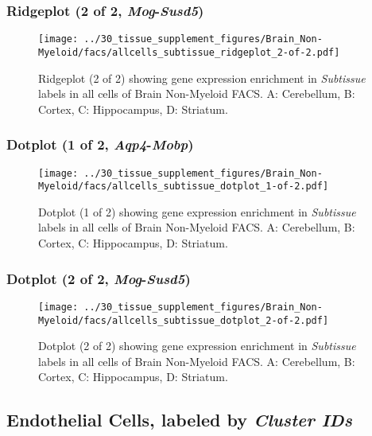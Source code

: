 \clearpage

\subsubsection{Ridgeplot (2 of 2, \emph{Mog}-\emph{Susd5})}
\begin{figure}[h]
\centering
\texttt{[image: ../30\_tissue\_supplement\_figures/Brain\_Non-Myeloid/facs/allcells\_subtissue\_ridgeplot\_2-of-2.pdf]}

\caption{ Ridgeplot (2 of 2)  showing gene expression enrichment in \emph{Subtissue} labels in all cells of Brain Non-Myeloid FACS. A: Cerebellum, B: Cortex, C: Hippocampus, D: Striatum.}
\end{figure}


\clearpage

\subsubsection{Dotplot (1 of 2, \emph{Aqp4}-\emph{Mobp})}
\begin{figure}[h]
\centering
\texttt{[image: ../30\_tissue\_supplement\_figures/Brain\_Non-Myeloid/facs/allcells\_subtissue\_dotplot\_1-of-2.pdf]}

\caption{ Dotplot (1 of 2)  showing gene expression enrichment in \emph{Subtissue} labels in all cells of Brain Non-Myeloid FACS. A: Cerebellum, B: Cortex, C: Hippocampus, D: Striatum.}
\end{figure}


\clearpage

\subsubsection{Dotplot (2 of 2, \emph{Mog}-\emph{Susd5})}
\begin{figure}[h]
\centering
\texttt{[image: ../30\_tissue\_supplement\_figures/Brain\_Non-Myeloid/facs/allcells\_subtissue\_dotplot\_2-of-2.pdf]}

\caption{ Dotplot (2 of 2)  showing gene expression enrichment in \emph{Subtissue} labels in all cells of Brain Non-Myeloid FACS. A: Cerebellum, B: Cortex, C: Hippocampus, D: Striatum.}
\end{figure}


\clearpage

\subsection{Endothelial Cells, labeled by \emph{Cluster IDs}}
